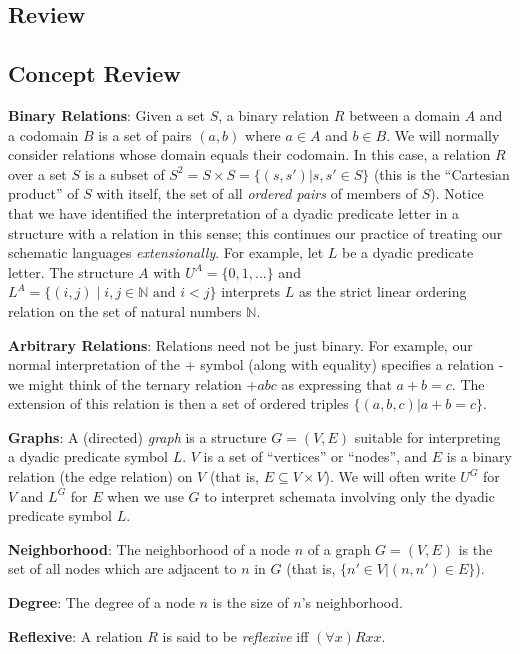 \subsection{Review}
\begin{mdframed}[linewidth=1]
\section*{Concept Review}
\textbf{Binary Relations}:
Given a set $S$, a binary relation $R$ between a domain $A$ and a codomain $B$ is a set of pairs $(a, b)$ where $a \in A$ and $b \in B$. We will normally consider relations whose domain equals their codomain. In this case, a relation $R$ over a set $S$ is a subset of $S^2 = S \times S = \{(s, s') | s, s' \in S\}$ (this is the ``Cartesian product'' of $S$ with itself, the set of all \emph{ordered pairs} of members of $S$). 
Notice that we have identified the interpretation of a dyadic predicate letter in a structure with a relation in this sense; this continues our practice of treating our schematic languages \emph{extensionally}.
For example, let $L$ be a dyadic predicate letter. The structure $A$ with $U^A=\{0,1,\ldots\}$ and $L^A=\{(i,j)\mid i,j\in\mathbb{N}\mbox{ and } i<j\}$ interprets $L$ as the strict linear ordering relation on the set of natural numbers $\mathbb{N}$.
 
\textbf{Arbitrary Relations}:
Relations need not be just binary. For example, our normal interpretation of the $+$ symbol (along with equality) specifies a relation - we might think of the ternary relation $+abc$ as expressing that $a + b = c$. The extension of this relation is then a set of ordered triples $\{(a, b, c) | a + b = c\}$. 

\textbf{Graphs}:
A (directed) \emph{graph} is a structure $G = (V,E)$ suitable for interpreting a dyadic predicate symbol $L$.  $V$ is a set of ``vertices'' or ``nodes'', and $E$ is a binary relation (the edge relation) on $V$ (that is, $E \subseteq V \times V$). We will often write $U^G$ for $V$ and $L^G$ for $E$ when we use $G$ to interpret schemata involving only the dyadic predicate symbol $L$.

\textbf{Neighborhood}: The neighborhood of a node $n$ of a graph $G=(V,E)$ is the set of all nodes which are adjacent to $n$ in $G$ (that is, $\{n'\in V | (n,n')\in E \}$).

\textbf{Degree}: The degree of a node $n$ is the size of $n$'s neighborhood. 


\textbf{Reflexive}: A relation $R$ is said to be \emph{reflexive} iff $(\forall x)Rxx$. 


\end{mdframed}
